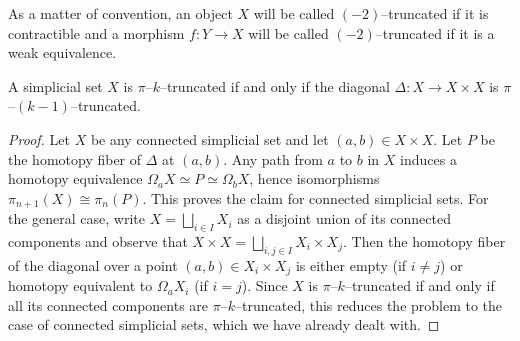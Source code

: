 As a matter of convention, an object \(X\) will be called \((-2)\)--truncated if it is contractible and a morphism \(f\colon Y\to X\) will be called \((-2)\)--truncated if it is a weak equivalence.

\begin{lemma}\label{lem:truncated-diagonal}
  A simplicial set \(X\) is \(\pi\)--\(k\)--truncated if and only if the diagonal \(\Delta\colon X\to X\times X\) is \(\pi\)--\((k-1)\)--truncated.
\end{lemma}
\begin{proof}
  Let \(X\) be any connected simplicial set and let \((a,b)\in X\times X\). Let \(P\) be the homotopy fiber of \(\Delta\) at \((a,b)\).  Any path from \(a\) to \(b\) in \(X\) induces a homotopy equivalence \(\Omega_{a}X \simeq P \simeq \Omega_{b} X\), hence isomorphisms \(\pi_{n+1}(X)\cong \pi_{n}(P)\). This proves the claim for connected simplicial sets. For the general case, write \(X = \bigsqcup_{i\in I} X_{i}\) as a disjoint union of its connected components and observe that \(X\times X = \bigsqcup_{i,j\in I} X_{i}\times X_{j}\). Then the homotopy fiber of the diagonal over a point \((a,b)\in X_{i}\times X_{j}\) is either empty (if \(i\neq j\)) or homotopy equivalent to \(\Omega_{a}X_{i}\) (if \(i = j\)). Since \(X\) is \(\pi\)--\(k\)--truncated if and only if all its connected components are \(\pi\)--\(k\)--truncated, this reduces the problem to the case of connected simplicial sets, which we have already dealt with.
\end{proof}


